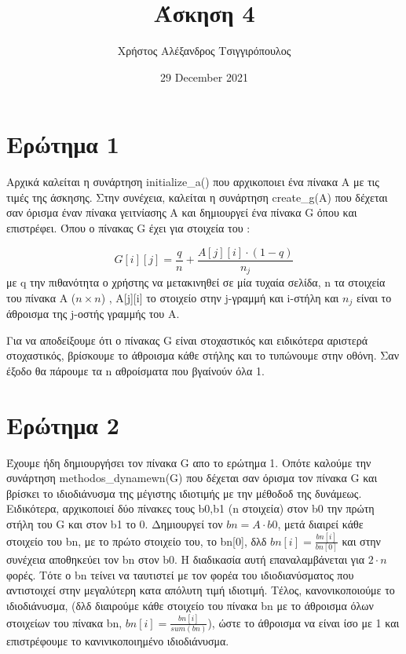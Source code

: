 \documentclass{article}
\title{Άσκηση 4}
\author{Χρήστος Αλέξανδρος Τσιγγιρόπουλος}
\date{29 December 2021}
\begin{document}
    \maketitle
    \section{Ερώτημα 1}
    Αρχικά καλείται η συνάρτηση initialize\_a() που αρχικοποιει ένα πίνακα A με
    τις τιμές της άσκησης. Στην συνέχεια, καλείται η συνάρτηση create\_g(A) που 
    δέχεται σαν όρισμα έναν πίνακα γειτνίασης Α και δημιουργεί ένα πίνακα G όπου και επιστρέφει. Όπου ο πίνακας G έχει για στοιχεία του : 
    
    \begin{equation*}
    G[i][j] = \frac{q}{n} + \frac{A[j][i] \cdot (1-q)}{n_j}    
    \end{equation*}
    με q την πιθανότητα ο χρήστης να μετακινηθεί σε μία τυχαία σελίδα, n τα στοιχεία του πίνακα A ($n\times n$) , A[j][i] το στοιχείο στην j-γραμμή και i-στήλη και 
    $n_j$ είναι το ά\-θροι\-σμα της j-οστής γραμμής του A. 
    
    Για να αποδείξουμε ότι ο πίνακας G είναι στοχαστικός και ειδικότερα αριστερά στοχαστικός, βρίσκουμε το άθροισμα κάθε στήλης και το τυπώνουμε στην οθόνη. Σαν έξοδο θα πάρουμε τα n αθροίσματα που βγαίνούν όλα 1.
    
    \section{Ερώτημα 2}
    
    Έχουμε ήδη δημιουργήσει τον πίνακα G απο το ερώτημα 1. Οπότε καλούμε την συνάρτηση methodos\_dynamewn(G) που δέχεται σαν όρισμα
    τον πίνακα G και βρίσκει το ιδιοδιάνυσμα της μέγιστης ιδιοτιμής με την μέθοδοδ της δυνάμεως. 
    Ειδικότερα, αρχικοποιεί δύο πίνακες τους b0,b1 (n στοιχεία) στον b0 την πρώτη στήλη του G και στον b1 το 0.
    Δημιουργεί τον $bn = A \cdot b0$, μετά διαιρεί κάθε στοιχείο του bn, με το πρώτο στοιχείο του, το bn[0], δλδ $bn[i]=\frac{bn[i]}{bn[0]} $  και στην συνέχεια αποθηκεύει τον bn στον b0.
    Η διαδικασία αυτή επαναλαμβάνεται για $2\cdot n$ φορές. Τότε ο bn τείνει να ταυτιστεί με τον φορέα του ιδιοδιανύσματος που αντιστοιχεί στην μεγαλύτερη κατα απόλυτη τιμή ιδιοτιμή. 
    Τέλος, κανονικοποιούμε το ιδιοδιάνυσμα, (δλδ διαιρούμε κάθε στοιχείο του πίνακα bn με το άθροισμα όλων στοιχείων του πίνακα bn, $bn[i]=\frac{bn[i]}{sum(bn)}$), ώστε το άθροισμα να είναι ίσο με 1 
    και επιστρέφουμε το κανινικοποιημένο ιδιοδιάνυσμα.
    
\end{document}
